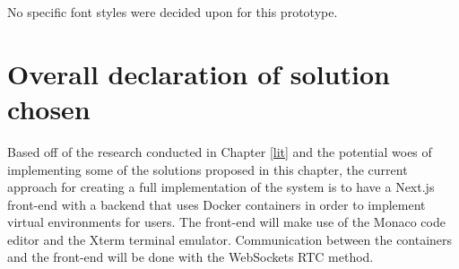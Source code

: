 No specific font styles were decided upon for this prototype.

\section{Overall declaration of solution chosen}

Based off of the research conducted in Chapter \ref{lit} and the potential woes of implementing some of the solutions proposed in this chapter, the current approach for creating a full implementation of the system is to have a Next.js front-end with a backend that uses Docker containers in order to implement virtual environments for users. The front-end will make use of the Monaco code editor and the Xterm terminal emulator. Communication between the containers and the front-end will be done with the WebSockets RTC method.


\pagebreak
